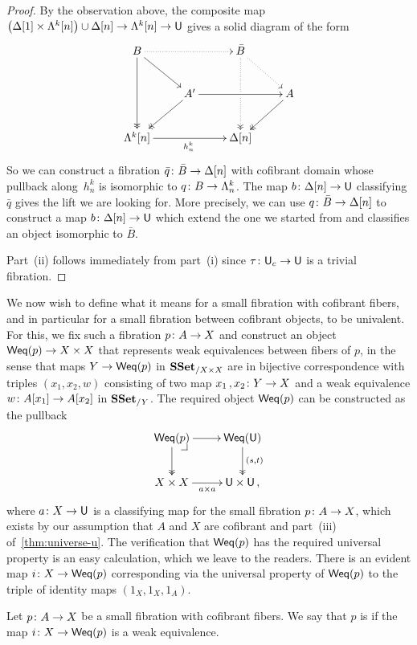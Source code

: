 \documentclass[reqno,10pt,a4paper,oneside,draft]{amsart}
\begin{document}
\begin{proof}
By the observation above, the composite map $\big( \Delta[1] \times \Lambda^k[n]  \big) \cup \Delta[n] \rightarrow \Lambda^k[n] \to \mathsf{U}$  gives a solid diagram of the form
\[ 
\xymatrix{
  B
  \ar@{.>}[rr]
  \ar[dr]
  \ar@{->>}[dd]
&&
  \bar{B}
  \ar@{.>}[dr]
  \ar@{.>>}[dd]|{\hole}
&\\&
  A'
  \ar[rr]
  \ar@{->>}[dl]
&&
  A
  \ar@{->>}[dl]
\\
  \Lambda^k[n]
  \ar[rr]_{h^k_n}
&&
  \Delta[n]
&
}
\] 
So we can construct a fibration  $\bar{q} \colon \bar{B} \to \Delta[n]$ with cofibrant domain whose pullback 
along~$h^k_n$ is isomorphic to $q \colon B \to \Lambda^k_n$. The map $b \colon \Delta[n] \rightarrow \mathsf{U}$ classifying $\bar{q}$ gives the lift we are looking for. More precisely, we can use $q  \colon \bar{B} \to
\Delta[n]$ to construct  a map $b \colon \Delta[n] \rightarrow \mathsf{U}$ which extend the one we started from and classifies 
an object isomorphic to $\bar{B}$.

Part~(ii) follows immediately from part~(i) since $\tau \colon \mathsf{U}_c \to \mathsf{U}$ is a trivial fibration.
\end{proof}




We now wish to define  what it means for a small fibration with cofibrant fibers, and in particular for a small fibration between cofibrant objects, to  be univalent. For this, we fix such a fibration $p \colon A \to X$ and construct an object $\mathsf{Weq}(p) \to X \times X$ that represents weak
equivalences between fibers of $p$, in the sense that maps $Y \to \mathsf{Weq}(p)$ in $\mathbf{SSet}_{/X \times X}$ are in bijective correspondence with triples $(x_1, x_2, w)$ consisting of two map $x_1 \, , x_2 \colon Y \to X$ and a weak equivalence $w \colon A[x_1]
\to A[x_2]$ in $\mathbf{SSet}_{/Y}$. The required object $\mathsf{Weq}(p)$ can be constructed as the pullback
\[
\xymatrix{
\Weq(p) \drpullback \ar[r] \ar@{->>}[d] & \Weq(\U) \ar@{->>}[d]^{(s,t)} \\
X \times X \ar[r]_{a \times a} & \U \times \U \, ,}
\]
where $a \colon X \to \mathsf{U}$ is a classifying map for the small fibration $p \colon A \to X$, which exists by our assumption
that $A$ and $X$ are cofibrant and part~(iii) of~\cref{thm:universe-u}. The verification that $\mathsf{Weq}(p)$
has the required universal property is an easy calculation, which we leave to the readers. There is an
evident map $i \colon X \to \mathsf{Weq}(p)$ corresponding via the universal property of $\mathsf{Weq}(p)$ to the triple of identity maps $(1_X, 1_X, 1_A)$.




\begin{definition}  \label{equ:characterisations-of-univalence} Let $p \colon A \to X$ be a small fibration with cofibrant fibers. We say that $p$ is  if the map $i \colon X \to \mathsf{Weq}(p)$ is a weak equivalence. 
\end{definition}
\end{document}

